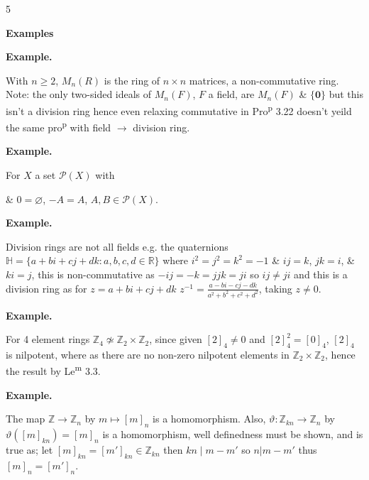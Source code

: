 \documentclass[8pt]{extarticle}
\newcommand{\fitdisplay}[1]{%
  \par\vspace{-1pt}\noindent
  \sbox{\fitdisplaybox}{#1}%
  \makebox[\columnwidth][c]{%
    \ifdim\wd\fitdisplaybox>\columnwidth
      \resizebox{\columnwidth}{!}{#1}%
    \else
      \usebox{\fitdisplaybox}%
    \fi
  }%
  \par\vspace{-1pt}%
}
\newenvironment{example}{%
  \begin{tcolorbox}[exampleboxstyle]%
  \textbf{Example.}\ \normalfont
  \ignorespaces
}{%
  \end{tcolorbox}%
}
\begin{document}
\begin{multicols}{5}
        \begin{samepage}
        \vspace{2pt}
        {\centering\fontsize{6}{6.8}\selectfont\textbf{Examples}\par}
        \vspace{2pt}

        \begin{example}
            With \(n\ge 2\), \(M_n(R)\) is the ring of \(n\times n\) matrices, a non-commutative ring.
            {\footnotesize Note: the only two-sided ideals of \(M_n(F)\), \(F\) a field, are \(M_n(F)\) \& \(\{\mathbf{0}\}\) but this isn't a division ring hence even relaxing commutative in Pro\textsuperscript{p} 3.22 doesn't yeild the same pro\textsuperscript{p} with field \(\to\) division ring.}
        \end{example}
        \end{samepage}

        \begin{example}
            For \(X\) a set \(\mathcal{P}(X)\) with
            
            \fitdisplay{\(\begin{aligned}A+B&=(A\cup B)\setminus(A\cap B),\\ AB&=A\cap B\end{aligned}\)}

            \& \(0=\varnothing\), \(-A=A\), \(A,B\in\mathcal{P}(X)\).
        \end{example}

        \begin{example}
            Division rings are not all fields e.g. the quaternions \(\mathbb{H}=\{a+bi+cj+dk:a,b,c,d\in\mathbb{R}\}\) where \(i^2=j^2=k^2=-1\) \& \(ij=k\), \(jk=i\), \& \(ki=j\), this is non-commutative as \(-ij=-k=jjk=ji\) so \(ij\ne ji\) and this is a division ring as for \(z=a+bi+cj+dk\) \(z^{-1}=\frac{a-bi-cj-dk}{a^2+b^2+c^2+d^2}\), taking \(z\ne0\).
        \end{example}

        \begin{example}
            For 4 element rings \(\mathbb{Z}_4 \not\simeq \mathbb{Z}_2\times\mathbb{Z}_2\), since given \([2]_4\ne0\) and \([2]_4^2=[0]_4\), \([2]_4\) is nilpotent, where as there are no non-zero nilpotent elements in \(\mathbb{Z}_2\times\mathbb{Z}_2\), hence the result by Le\textsuperscript{m} 3.3.
        \end{example}

        \begin{example}
            The map \(\mathbb{Z}\to\mathbb{Z}_n\) by \(m\mapsto[m]_n\) is a homomorphism. Also, \(\vartheta:\mathbb{Z}_{kn}\to\mathbb{Z}_n\) by \(\vartheta([m]_{kn})=[m]_n\) is a homomorphism, well definedness must be shown, and is true as; let \([m]_{kn}=[m']_{kn}\in\mathbb{Z}_{kn}\) then \(kn\mid m-m'\) so \(n|m-m'\) thus \([m]_n=[m']_{n}\).
        \end{example}


\end{multicols}
\end{document}
